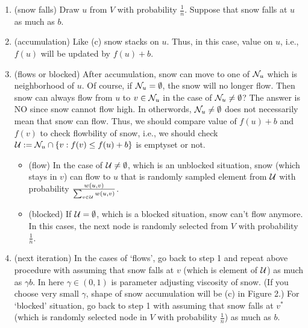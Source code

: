\documentclass[preprint, review, 12pt]{article}
\theoremstyle{definition}
\theoremstyle{remark}
\begin{document}
\begin{enumerate}[1.]
\item (snow falls) Draw $u$ from $V$ with probability $\frac{1}{n}$. Suppose that snow falls at $u$ as much as $b$. 
\item (accumulation) Like (c) snow stacks on $u$. Thus, in this case, value on $u$, i.e., $f(u)$ will be updated by $f(u)+b$. 
\item (flows or blocked) After accumulation, snow can move to one of ${\cal N}_{u}$ which is neighborhood of $u$. Of course, if ${\cal N}_{u}=\emptyset$, the snow will no longer flow. Then snow can always flow from $u$ to $v \in {\cal N}_{u}$ in the case of ${\cal N}_{u}\neq \emptyset$? The answer is NO since snow cannot flow high. In otherwords, ${\cal N}_{u}\neq \emptyset$ does not necessarily mean that snow can flow. Thus, we should compare value of $f(u)+b$ and $f(v)$ to check flowbility of snow, i.e., we should check ${\cal U}:={\cal N}_{u} \cap \{v: f(v) \leq f(u)+b\}$ is emptyset or not.
\begin{itemize}
\item (flow) In the case of ${\cal U}\neq\emptyset$, which is an unblocked situation, snow (which stays in $v$) can flow to $u$ that is randomly sampled element from ${\cal U}$ with probability $\frac{w(u,v)}{\sum_{v \in {\cal U}}w(u,v) }$. 
\item (blocked) If ${\cal U}=\emptyset$, which is a blocked situation, snow can't flow anymore. In this cases, the next node is randomly selected from $V$ with probability $\frac{1}{n}$. 
\end{itemize}
\item (next iteration) In the cases of `flows', go back to step 1 and repeat above procedure with assuming that snow falls at $v$ (which is element of ${\cal U}$) as much as $\gamma b$. In here $\gamma \in (0,1)$ is parameter adjusting viscosity of snow. (If you choose very small $\gamma$, shape of snow accumulation will be (c) in Figure 2.) For `blocked' situation, go back to step 1 with assuming that snow falls at $v^*$ (which is randomly selected node in $V$ with probability $\frac{1}{n}$) as much as $b$.
  
\end{enumerate}
\end{document}
